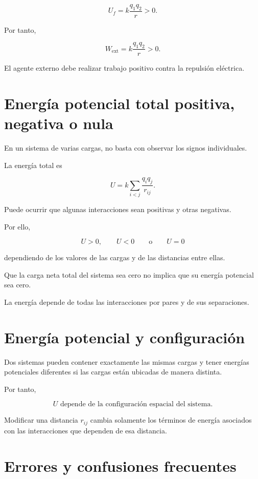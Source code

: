 \[
U_f=k\frac{q_1q_2}{r}>0.
\]

Por tanto,

\[
\boxed{
W_{\text{ext}}
=
k\frac{q_1q_2}{r}>0
}.
\]

El agente externo debe realizar trabajo positivo contra la repulsión eléctrica.


\section{Energía potencial total positiva, negativa o nula}

En un sistema de varias cargas, no basta con observar los signos individuales.

La energía total es

\[
U
=
k\sum_{i<j}
\frac{q_iq_j}{r_{ij}}.
\]

Puede ocurrir que algunas interacciones sean positivas y otras negativas.

Por ello,

\[
U>0,
\qquad
U<0
\qquad\text{o}\qquad
U=0
\]

dependiendo de los valores de las cargas y de las distancias entre ellas.

\begin{advertencia}

Que la carga neta total del sistema sea cero no implica que su energía potencial sea
cero.

La energía depende de todas las interacciones por pares y de sus separaciones.

\end{advertencia}


\section{Energía potencial y configuración}

Dos sistemas pueden contener exactamente las mismas cargas y tener energías
potenciales diferentes si las cargas están ubicadas de manera distinta.

Por tanto,

\[
\boxed{
U\text{ depende de la configuración espacial del sistema}
}.
\]

Modificar una distancia \(r_{ij}\) cambia solamente los términos de energía asociados
con las interacciones que dependen de esa distancia.


\section{Errores y confusiones frecuentes}

